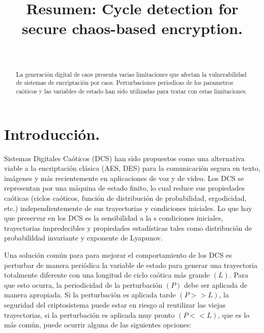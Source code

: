 \documentclass[10pt]{IEEEtran}
\title {Resumen: Cycle detection for secure chaos-based encryption.}
\author{\IEEEauthorblockN{Marcos Daniel Calderón Calderón}\\
\IEEEauthorblockA{Maestría en Ciencias de la Computación\\
Centro de Investigación en Matemáticas (CIMAT)\\
Guanajuato , Gto.\\
marcos.calderon@cimat.mx}}
\begin{document}
\maketitle
\begin{abstract}
La generación digital de caos presenta varias limitaciones que afectan la vulnerabilidad de sistemas de encriptación por caos. Perturbaciones periodicas de los parametros caóticos y las variables de estado han sido utilizadas para tratar con estas limitaciones.
\end{abstract}

\section{Introducción.}

Sistemas Digitales Caóticos (DCS) han sido propuestos como una alternativa viable a la encriptación clásica (AES, DES) para la comunicación segura en texto, imágenes y más recientemente en aplicaciones de voz y de video. Los DCS se representan por una máquina de estado finito, lo cual reduce sus propiedades caóticas (ciclos caóticos, función de distribución de probabilidad, ergodicidad, etc.) independientemente de sus trayectorias y condiciones iniciales. Lo que hay que preservar en los DCS es la sensibilidad a la s condiciones iniciales, trayectorias impredecibles y propiedades estadísticas tales como distribución de probabilildad invariante y exponente de Lyapunov.
 
Una solución común para para mejorar el comportamiento de los DCS es perturbar de manera periódica la variable de estado para generar una trayectoria totalmente diferente con una longitud de ciclo caótica más grande $(L)$. Para que esto ocurra, la periodicidad de la perturbación $(P)$ debe ser aplicada de manera apropiada. Si la perturbación es aplicada tarde $(P>>L)$, la seguridad del criptosistema puede estar en riesgo al reutilizar las viejas trayectorias, si la perturbación es aplicada muy pronto $(P<<L)$, que es lo más común, puede ocurrir alguna de las siguientes opciones:
\end{document}
